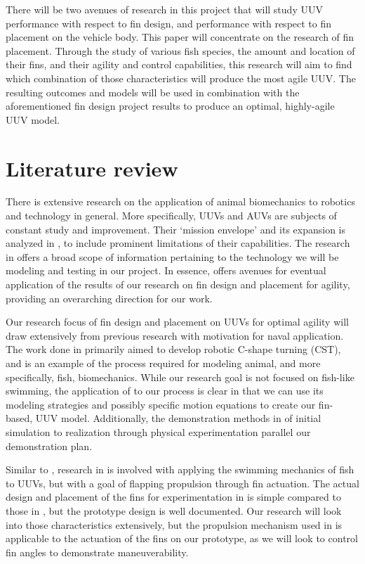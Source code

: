 \documentclass{IEEEtran}
\begin{document}
There will be two avenues of research in this project that will study UUV performance with respect to fin design, and performance with respect to fin placement on the vehicle body. This paper will concentrate on the research of fin placement. Through the study of various fish species, the amount and location of their fins, and their agility and control capabilities, this research will aim to find which combination of those characteristics will produce the most agile UUV. The resulting outcomes and models will be used in combination with the aforementioned fin design project results to produce an optimal, highly-agile UUV model.





\section{Literature review}
There is extensive research on the application of animal biomechanics to robotics and technology in general. More specifically, UUVs and AUVs are subjects of constant study and improvement. Their ‘mission envelope’ and its expansion is analyzed in \cite{nrc2005autonomous}, to include prominent limitations of their capabilities. The research in \cite{nrc2005autonomous} offers a broad scope of information pertaining to the technology we will be modeling and testing in our project. In essence, \cite{nrc2005autonomous} offers avenues for eventual application of the results of our research on fin design and placement for agility, providing an overarching direction for our work.

Our research focus of fin design and placement on UUVs for optimal agility will draw extensively from previous research with motivation for naval application. The work done in \cite{noaa2009how} primarily aimed to develop robotic C-shape turning (CST), and is an example of the process required for modeling animal, and more specifically, fish, biomechanics. While our research goal is not focused on fish-like swimming, the application of \cite{noaa2009how} to our process is clear in that we can use its modeling strategies and possibly specific motion equations to create our fin-based, UUV model. Additionally, the demonstration methods in \cite{noaa2009how} of initial simulation to realization through physical experimentation parallel our demonstration plan.

Similar to \cite{noaa2009how}, research in \cite{maslin2020raising} is involved with applying the swimming mechanics of fish to UUVs, but with a goal of flapping propulsion through fin actuation. The actual design and placement of the fins for experimentation in \cite{maslin2020raising} is simple compared to those in \cite{noaa2009how}, but the prototype design is well documented. Our research will look into those characteristics extensively, but the propulsion mechanism used in \cite{maslin2020raising} is applicable to the actuation of the fins on our prototype, as we will look to control fin angles to demonstrate maneuverability.
\end{document}

